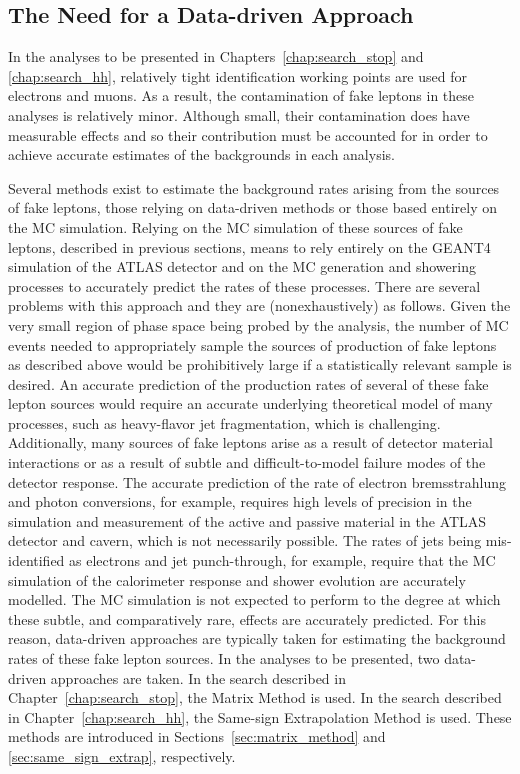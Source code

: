 \subsection{The Need for a Data-driven Approach}
\label{sec:fake_dd_motivation}

In the analyses to be presented in Chapters~\ref{chap:search_stop} and \ref{chap:search_hh},
relatively tight identification working points are used for electrons and muons.
As a result, the contamination of fake leptons in these analyses is relatively
minor.
Although small, their contamination does have measurable effects and so their contribution
must be accounted for in order to achieve accurate estimates of the backgrounds
in each analysis.

Several methods exist to estimate the background rates arising from the sources of fake
leptons, those relying on data-driven methods or those based entirely on the MC
simulation.
Relying on the MC simulation of these sources of fake leptons, described in previous
sections, means to rely entirely on the \textsc{GEANT4} simulation of the ATLAS detector
and on the MC generation and showering processes to accurately predict the
rates of these processes.
There are several problems with this approach and they are (nonexhaustively) as follows.
Given the very small region of phase space being probed by the analysis,
the number of MC events needed to appropriately sample the sources of production of fake
leptons as described above would be prohibitively large if a statistically relevant sample
is desired.
An accurate prediction of the production rates of several of these fake lepton sources
would require an accurate underlying theoretical model of many processes, such as
heavy-flavor jet fragmentation, which is challenging.
Additionally, many sources of fake leptons arise as a result of detector material interactions
or as a result of subtle and difficult-to-model failure modes of the detector response.
The accurate prediction of the rate of electron bremsstrahlung and photon conversions, for example, requires
high levels of precision in the simulation and measurement of the active and passive material in the ATLAS detector and cavern,
which is not necessarily possible.
The rates of jets being mis-identified as electrons and jet punch-through, for example,
require that the MC simulation of the calorimeter response and shower evolution are
accurately modelled.
The MC simulation is not expected to perform to the degree at which these subtle, and comparatively rare, effects
are accurately predicted.
For this reason, data-driven approaches are typically taken for estimating the background rates
of these fake lepton sources.
In the analyses to be presented, two data-driven approaches are taken.
In the search described in Chapter~\ref{chap:search_stop}, the Matrix Method
is used.
In the search described in Chapter~\ref{chap:search_hh}, the Same-sign Extrapolation
Method is used.
These methods are introduced in Sections~\ref{sec:matrix_method} and \ref{sec:same_sign_extrap}, respectively.


